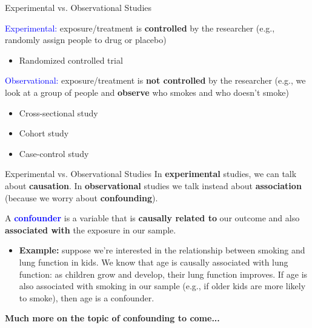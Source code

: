 \documentclass[10pt,t]{beamer}
\begin{document}
\begin{frame}{Experimental vs. Observational Studies}

\textcolor{blue}{Experimental:} exposure/treatment is \textbf{controlled} by the researcher (e.g., randomly assign people to drug or placebo)
\begin{itemize}
	\item Randomized controlled trial 
\end{itemize}

\vspace{0.3cm}

\textcolor{blue}{Observational:} exposure/treatment is \textbf{not controlled} by the researcher (e.g., we look at a group of people and \textbf{observe} who smokes and who doesn't smoke)
\begin{itemize}
	\item Cross-sectional study
	\item Cohort study
	\item Case-control study
\end{itemize}
\end{frame}
	
	
\begin{frame}{Experimental vs. Observational Studies}
In \textbf{experimental} studies, we can talk about \color{blue} \textbf{causation}\color{black}. In \textbf{observational} studies we  talk instead about \color{blue} \textbf{association} \color{black}(because we worry about \color{blue} \textbf{confounding}\color{black}). \\

\vspace{0.3cm}

A \textbf{\textcolor{blue}{confounder}} is a variable that is \textbf{causally related to} our outcome and also \textbf{associated with} the exposure in our sample.  \\

\vspace{0.3cm}

\begin{itemize}
	\item[] \textbf{Example:} suppose we're interested in the relationship between smoking and lung function in kids. We know that age is causally associated with lung function: as children grow and develop, their lung function improves. If age is also associated with smoking in our sample (e.g., if older kids are more likely to smoke), then age is a confounder.
\end{itemize} 

\vspace{0.3cm}

\small \textbf{Much more on the topic of confounding to come...} 
\end{frame}
\end{document}
